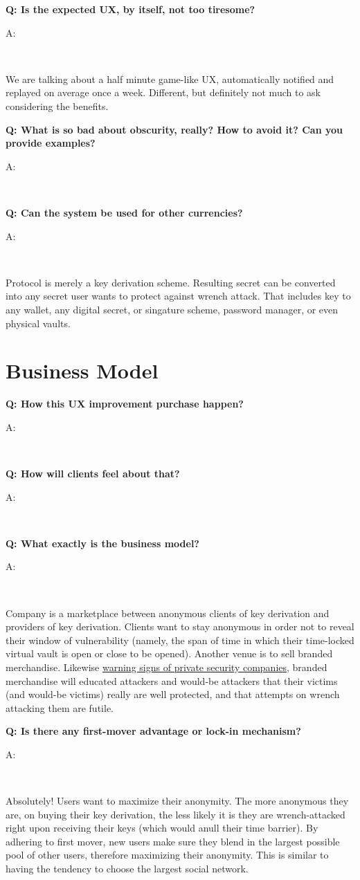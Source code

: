 \documentclass[12pt,a4paper]{article}
\newenvironment{question}[1]{%
  \vspace{0.8em}\noindent\textbf{Q: #1}\par
  \vspace{0.2em}\noindent\begin{itshape}A:\end{itshape}~%
}{\vspace{0.8em}}
\newcommand{\privsecplaque}{https://duckduckgo.com/?q=prosegur+verisure+\%22warning+sign\%22+facade\&iar=images\&t=brave\&iaf=type\%3Aphoto}
\begin{document}
\begin{question}{Is the expected UX, by itself, not too tiresome?}
We are talking about a half minute game-like UX, automatically notified and replayed on average once a week. Different, but definitely not much to ask considering the benefits.
\end{question}

\begin{question}{What is so bad about obscurity, really? How to avoid it? Can you provide examples?}
\end{question}

\begin{question}{Can the system be used for other currencies?}
Protocol is merely a key derivation scheme. Resulting secret can be converted into any secret user wants to protect against wrench attack. That includes key to any wallet, any digital secret, or singature scheme, password manager, or even physical vaults.
\end{question}

\section{Business Model}

\begin{question}{How this UX improvement purchase happen?}
\end{question}

\begin{question}{How will clients feel about that?}
\end{question}

\begin{question}{What exactly is the business model?}
Company is a marketplace between anonymous clients of key derivation and providers of key derivation. Clients want to stay anonymous in order not to reveal their window of vulnerability (namely, the span of time in which their time-locked virtual vault is open or close to be opened).
Another venue is to sell branded merchandise. Likewise \href{\privsecplaque}{warning signs of private security companies}, branded merchandise will educated attackers and would-be attackers that their victims (and would-be victims) really are well protected, and that attempts on wrench attacking them are futile.
\end{question}

\begin{question}{Is there any first-mover advantage or lock-in mechanism?}
Absolutely! Users want to maximize their anonymity. The more anonymous they are, on buying their key derivation, the less likely it is they are wrench-attacked right upon receiving their keys (which would anull their time barrier). By adhering to first mover, new users make sure they blend in the largest possible pool of other users, therefore maximizing their anonymity. This is similar to having the tendency to choose the largest social network.
\end{question}
\end{document}
